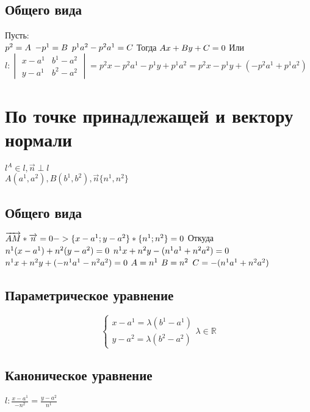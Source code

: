 \documentclass{book}
\begin{document}
\subsection{Общего вида}
Пусть:\\
$p^2=A\\$
$-p^1=B\\$
$p^1a^2-p^2a^1=C\\$
Тогда $Ax+By+C=0\\$
Или $l:\begin{vmatrix}
    x-a^1 & b^1-a^2\\
    y-a^1 & b^2-a^2
\end{vmatrix}=p^2x-p^2a^1-p^1y+p^1a^2=p^2x-p^1y+(-p^2a^1+p^1a^2)$\\
\section{По точке принадлежащей и вектору нормали}
$l^A \in l,\overrightarrow{n} \perp l$\\
$A(a^1,a^2),B(b^1,b^2),\overrightarrow{n}\{n^1,n^2\}$
\subsection{Общего вида}
$\overrightarrow{AM}*\overrightarrow{n}=0 -> \{x-a^1;y-a^2\}*\{n^1;n^2\}=0\\$
Откуда\\
$n^1(x-a^1)+n^2(y-a^2)=0\\$
$n^1x+n^2y-(n^1a^1+n^2a^2)=0\\$
$n^1x+n^2y+(-n^1a^1-n^2a^2)=0\\$
$A=n^1\\$
$B=n^2\\$
$C=-(n^1a^1+n^2a^2)\\$
\subsection{Параметрическое уравнение}
\begin{equation}
    \begin{cases}
      x-a^1=\lambda(b^1-a^1)\\
      y-a^2=\lambda(b^2-a^2)
    \end{cases}\lambda \in \mathbb{R}
\end{equation}
\subsection{Каноническое уравнение}
$l:\frac{x-a^1}{-n^2}=\frac{y-a^2}{n^1}$
\end{document}
